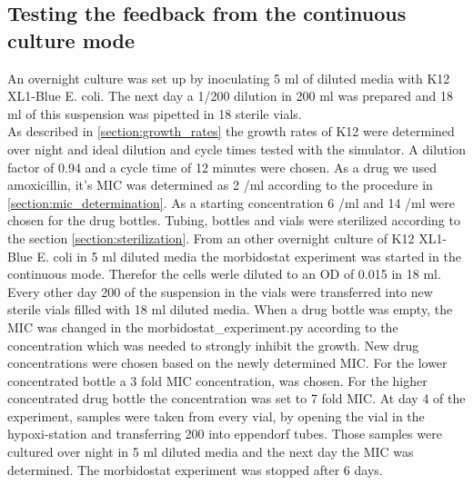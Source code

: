 \subsection{Testing the feedback from the continuous culture mode}
An overnight culture was set up by inoculating 5 ml of diluted media with K12 XL1-Blue E. coli. The next day a 1/200 dilution in 200 ml was prepared and 18 ml of this suspension was pipetted in 18 sterile vials. \\
As described in \ref{section:growth_rates} the growth rates of K12 were determined over night and ideal dilution and cycle times tested with the simulator. A dilution factor of 0.94 and a cycle time of 12 minutes were chosen. 
As a drug we used amoxicillin, it's MIC was determined as 2 \textmu/ml according to the procedure in \ref{section:mic_determination}. As a starting concentration 6 \textmu/ml and 14 \textmu/ml were chosen for the drug bottles. Tubing, bottles and vials were sterilized according to the section \ref{section:sterilization}. 
From an other overnight culture of K12 XL1-Blue E. coli in 5 ml diluted media the morbidostat experiment was started in the continuous mode. Therefor the cells werle diluted to an OD of 0.015 in 18 ml. Every other day 200 \textmu of the suspension in the vials were transferred into new sterile vials filled with 18 ml diluted media. When a drug bottle was empty, the MIC was changed in the morbidostat\_experiment.py according to the concentration which was needed to strongly inhibit the growth. New drug concentrations were chosen based on the newly determined MIC. For the lower concentrated bottle a 3 fold MIC concentration, was chosen. For the higher concentrated drug bottle the concentration was set to 7 fold MIC. At day 4 of the experiment, samples were taken from every vial, by opening the vial in the hypoxi-station and transferring 200 \textmu into eppendorf tubes. Those samples were cultured over night in 5 ml diluted media and the next day the MIC was determined. The morbidostat experiment was stopped after 6 days.
\label{section:morb_test}

